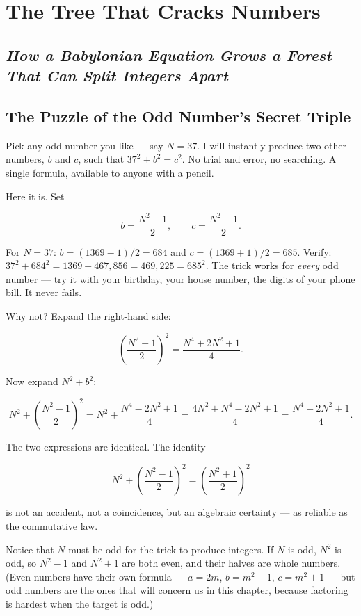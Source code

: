 \chapter{The Tree That Cracks Numbers}

\section*{\textit{How a Babylonian Equation Grows a Forest That Can Split Integers Apart}}

\bigskip

\section*{The Puzzle of the Odd Number's Secret Triple}

Pick any odd number you like --- say $N = 37$. I will instantly produce two other numbers, $b$ and $c$, such that $37^2 + b^2 = c^2$. No trial and error, no searching. A single formula, available to anyone with a pencil.

Here it is. Set

\[
b = \frac{N^2 - 1}{2}, \qquad c = \frac{N^2 + 1}{2}.
\]

For $N = 37$: $b = (1369 - 1)/2 = 684$ and $c = (1369 + 1)/2 = 685$. Verify: $37^2 + 684^2 = 1369 + 467{,}856 = 469{,}225 = 685^2$. The trick works for \textit{every} odd number --- try it with your birthday, your house number, the digits of your phone bill. It never fails.

Why not? Expand the right-hand side:

\[
\left(\frac{N^2 + 1}{2}\right)^{\!2} = \frac{N^4 + 2N^2 + 1}{4}.
\]

Now expand $N^2 + b^2$:

\[
N^2 + \left(\frac{N^2 - 1}{2}\right)^{\!2} = N^2 + \frac{N^4 - 2N^2 + 1}{4} = \frac{4N^2 + N^4 - 2N^2 + 1}{4} = \frac{N^4 + 2N^2 + 1}{4}.
\]

The two expressions are identical. The identity

\[
N^2 + \left(\frac{N^2 - 1}{2}\right)^{\!2} = \left(\frac{N^2 + 1}{2}\right)^{\!2}
\]

is not an accident, not a coincidence, but an algebraic certainty --- as reliable as the commutative law.

Notice that $N$ must be odd for the trick to produce integers. If $N$ is odd, $N^2$ is odd, so $N^2 - 1$ and $N^2 + 1$ are both even, and their halves are whole numbers. (Even numbers have their own formula --- $a = 2m$, $b = m^2 - 1$, $c = m^2 + 1$ --- but odd numbers are the ones that will concern us in this chapter, because factoring is hardest when the target is odd.)

